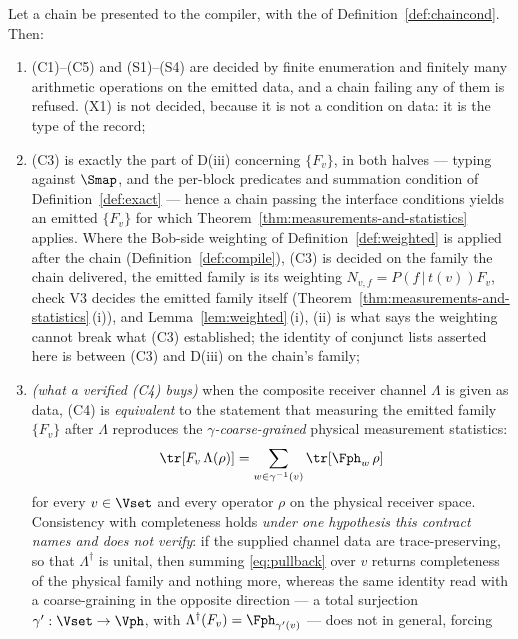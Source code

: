 \begin{theorem}
\label{thm:chain-consumption}
Let a chain be presented to the compiler, with the
 of
Definition~\ref{def:chaincond}. Then:
\begin{enumerate}[label=(\roman*),leftmargin=2.2em]
\item (C1)--(C5) and (S1)--(S4) are decided by finite enumeration and finitely
many arithmetic operations on the emitted data, and a chain failing any of
them is refused. (X1) is not decided,
because it is not a condition on data: it is the type of the record;
\item (C3) is exactly the part of D(iii) concerning $\{F_v\}$, in both halves
--- typing against $\Smap$, and the per-block predicates and summation
condition of Definition~\ref{def:exact} --- hence a chain passing the interface
conditions yields an emitted $\{F_v\}$ for which Theorem~\ref{thm:measurements-and-statistics}
applies. Where the Bob-side weighting of Definition~\ref{def:weighted} is
applied after the chain (Definition~\ref{def:compile}), (C3) is decided on the family the chain delivered,
the emitted family is its weighting $N_{v,f}=P(f\,|\,t(v))F_v$, check V3
decides the emitted family itself (Theorem~\ref{thm:measurements-and-statistics}\,(i)), and
Lemma~\ref{lem:weighted}\,(i), (ii) is what says the weighting cannot break
what (C3) established; the identity of conjunct lists asserted here is between
(C3) and D(iii) on the chain's family;
\item \emph{(what a verified (C4) buys)} when the composite receiver channel
$\Lambda$ is given as data, (C4) is \emph{equivalent} to the statement that
measuring the emitted family $\{F_v\}$ after $\Lambda$ reproduces the
\emph{$\gamma$-coarse-grained} physical measurement statistics:
\begin{equation}\label{eq:pullbackstats}
  \tr[F_v\,\Lambda(\rho)]=\sum_{w\in\gamma^{-1}(v)}\tr[\Fph_w\,\rho]
\end{equation}
for every $v\in\Vset$ and every operator $\rho$ on the physical receiver space.
Consistency with completeness holds \emph{under one hypothesis this contract
names and does not verify}: if the supplied channel data are trace-preserving,
so that $\Lambda^{\dagger}$ is unital, then summing \eqref{eq:pullback} over
$v$ returns completeness of the physical family and nothing more, whereas the
same identity read with a coarse-graining in the opposite direction --- a
total surjection $\gamma':\Vset\to\Vph$, with
$\Lambda^{\dagger}(F_v)=\Fph_{\gamma'(v)}$ --- does not in general, forcing

\end{enumerate}
\end{theorem}
